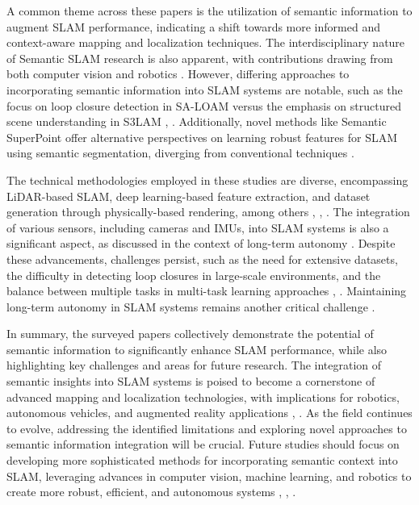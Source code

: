 \documentclass[conference]{IEEEtran}
\begin{document}
A common theme across these papers is the utilization of semantic information to augment SLAM performance, indicating a shift towards more informed and context-aware mapping and localization techniques. The interdisciplinary nature of Semantic SLAM research is also apparent, with contributions drawing from both computer vision and robotics \cite{b6}. However, differing approaches to incorporating semantic information into SLAM systems are notable, such as the focus on loop closure detection in SA-LOAM versus the emphasis on structured scene understanding in S3LAM \cite{b2}, \cite{b3}. Additionally, novel methods like Semantic SuperPoint offer alternative perspectives on learning robust features for SLAM using semantic segmentation, diverging from conventional techniques \cite{b4}.

The technical methodologies employed in these studies are diverse, encompassing LiDAR-based SLAM, deep learning-based feature extraction, and dataset generation through physically-based rendering, among others \cite{b2}, \cite{b4}, \cite{b5}. The integration of various sensors, including cameras and IMUs, into SLAM systems is also a significant aspect, as discussed in the context of long-term autonomy \cite{b7}. Despite these advancements, challenges persist, such as the need for extensive datasets, the difficulty in detecting loop closures in large-scale environments, and the balance between multiple tasks in multi-task learning approaches \cite{b4}, \cite{b5}. Maintaining long-term autonomy in SLAM systems remains another critical challenge \cite{b7}.

In summary, the surveyed papers collectively demonstrate the potential of semantic information to significantly enhance SLAM performance, while also highlighting key challenges and areas for future research. The integration of semantic insights into SLAM systems is poised to become a cornerstone of advanced mapping and localization technologies, with implications for robotics, autonomous vehicles, and augmented reality applications \cite{b1}, \cite{b6}. As the field continues to evolve, addressing the identified limitations and exploring novel approaches to semantic information integration will be crucial. Future studies should focus on developing more sophisticated methods for incorporating semantic context into SLAM, leveraging advances in computer vision, machine learning, and robotics to create more robust, efficient, and autonomous systems \cite{b2}, \cite{b3}, \cite{b4}.
\end{document}
